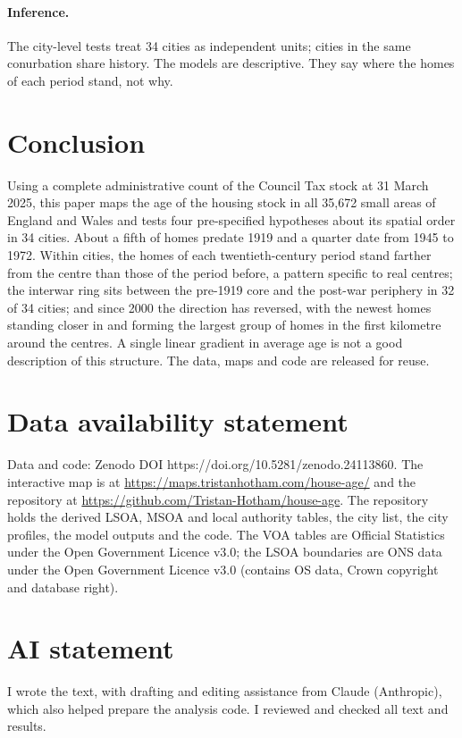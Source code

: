 \documentclass[11pt,a4paper]{article}
\begin{document}
\paragraph{Inference.} The city-level tests treat 34 cities as independent units; cities in the same conurbation share history. The models are descriptive. They say where the homes of each period stand, not why.

\section{Conclusion}
\label{sec:conclusion}
Using a complete administrative count of the Council Tax stock at 31 March 2025, this paper maps the age of the housing stock in all 35,672 small areas of England and Wales and tests four pre-specified hypotheses about its spatial order in 34 cities. About a fifth of homes predate 1919 and a quarter date from 1945 to 1972. Within cities, the homes of each twentieth-century period stand farther from the centre than those of the period before, a pattern specific to real centres; the interwar ring sits between the pre-1919 core and the post-war periphery in 32 of 34 cities; and since 2000 the direction has reversed, with the newest homes standing closer in and forming the largest group of homes in the first kilometre around the centres. A single linear gradient in average age is not a good description of this structure. The data, maps and code are released for reuse.

\section*{Data availability statement}
Data and code: Zenodo DOI https://doi.org/10.5281/zenodo.24113860. The interactive map is at \url{https://maps.tristanhotham.com/house-age/} and the repository at \url{https://github.com/Tristan-Hotham/house-age}. The repository holds the derived LSOA, MSOA and local authority tables, the city list, the city profiles, the model outputs and the code. The VOA tables are Official Statistics under the Open Government Licence v3.0; the LSOA boundaries are ONS data under the Open Government Licence v3.0 (contains OS data, Crown copyright and database right).

\section*{AI statement}
I wrote the text, with drafting and editing assistance from Claude (Anthropic), which also helped prepare the analysis code. I reviewed and checked all text and results.
\end{document}
